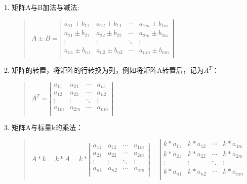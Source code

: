\documentclass[a4paper,10pt]{article}
\begin{document}
\begin{CJK}{UTF8}{song}
\begin{enumerate}
 \item 矩阵A与B加法与减法:
\begin{quote}
\begin{math}
A\pm B=\left|
\begin{array}{cccc}
a_{11} \pm b_{11}& a_{12}\pm b_{11}& \cdots & a_{1m} \pm b_{1m} \\
a_{21} \pm b_{21}& a_{22}\pm b_{22}& \cdots & a_{2m} \pm b_{2m} \\
\vdots & \vdots & \ddots & \vdots \\
a_{n1}\pm b_{n1} & a_{n2}\pm b_{n2} & \cdots & a_{nm}\pm b_{nm}\\
\end{array}
\right|
\end{math}
\end{quote}
\item 矩阵的转置，将矩阵的行转换为列，例如将矩阵A转置后，记为$A^{T}$：
\begin{quote}
\begin{math}
A^{T}=
\left|
\begin{array}{cccc}
a_{11} & a_{21} & \cdots & a_{n1} \\
a_{12} & a_{22} & \cdots & a_{n2} \\
\vdots & \vdots & \ddots & \vdots \\
a_{1m} & a_{2m} & \cdots & a_{nm} \\
\end{array}
\right|
\end{math}
\end{quote}
\item 矩阵A与标量k的乘法：
\begin{quote}
\begin{math}
A*k=k*A=k*\left|
\begin{array}{cccc}
a_{11} & a_{12} & \cdots & a_{1m} \\
a_{21} & a_{22} & \cdots & a_{2m} \\
\vdots & \vdots & \ddots & \vdots \\
a_{n1} & a_{n2} & \cdots & a_{nm} \\
\end{array}
   \right| 
=
\left|
\begin{array}{cccc}
k*a_{11} & k*a_{12} & \cdots & k*a_{1m} \\
k*a_{21} & k*a_{22} & \cdots & k*a_{2m} \\
\vdots & \vdots & \ddots & \vdots \\
k*a_{n1} & k*a_{n2} & \cdots & k*a_{nm} \\

\end{array}
\end{math}
\end{quote}
\end{enumerate}
\end{CJK}
\end{document}
